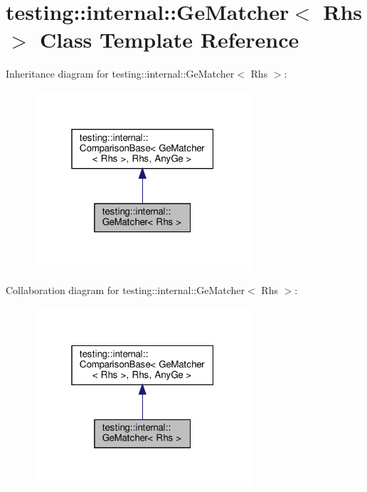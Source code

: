 \hypertarget{classtesting_1_1internal_1_1_ge_matcher}{}\section{testing\+:\+:internal\+:\+:Ge\+Matcher$<$ Rhs $>$ Class Template Reference}
\label{classtesting_1_1internal_1_1_ge_matcher}


Inheritance diagram for testing\+:\+:internal\+:\+:Ge\+Matcher$<$ Rhs $>$\+:
\nopagebreak
\begin{figure}[H]
\begin{center}
\leavevmode
\includegraphics[width=229pt]{classtesting_1_1internal_1_1_ge_matcher__inherit__graph}
\end{center}
\end{figure}


Collaboration diagram for testing\+:\+:internal\+:\+:Ge\+Matcher$<$ Rhs $>$\+:
\nopagebreak
\begin{figure}[H]
\begin{center}
\leavevmode
\includegraphics[width=229pt]{classtesting_1_1internal_1_1_ge_matcher__coll__graph}
\end{center}
\end{figure}
